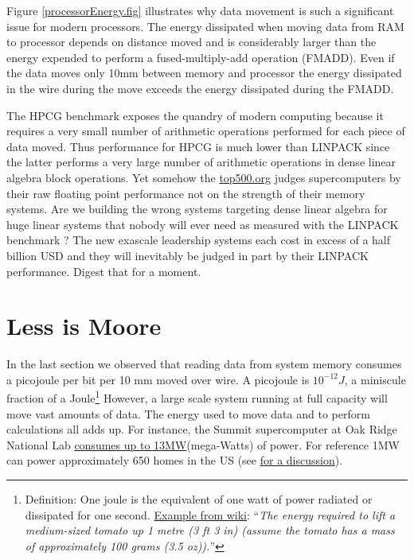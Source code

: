 Figure \ref{processorEnergy.fig} illustrates why data movement is such a significant issue for modern processors. The energy dissipated when moving data from RAM to processor depends on distance moved and is considerably larger than the energy expended to perform a fused-multiply-add operation (FMADD). Even if the data moves only 10mm between memory and processor the energy dissipated in the wire during the move exceeds the energy dissipated during the FMADD. 

The HPCG benchmark exposes the quandry of modern computing because it requires a very small number of arithmetic operations  performed for each piece of data moved. Thus performance for HPCG is much lower than LINPACK since the latter performs a very large number of arithmetic operations in dense linear algebra block operations.  Yet somehow the \href{http://top500.org}{top500.org} judges supercomputers by their raw floating point performance not on the strength of their memory systems. Are we building the wrong systems targeting dense linear algebra for huge linear systems that nobody will ever need as measured with the LINPACK benchmark ? The new exascale leadership systems each cost in excess of a half billion USD and they will  inevitably be  judged in part by their LINPACK performance. Digest that for a moment.


\section{Less is Moore}

In the last section we observed that reading data from system memory consumes a picojoule per bit per 10 mm moved over wire. A picojoule is $10^{-12}J$, a miniscule fraction of a Joule\footnote{Definition: One joule is the equivalent of one watt of power radiated or dissipated for one second. \href{https://en.wikipedia.org/wiki/Joule}{Example from wiki}: ``\emph{The energy required to lift a medium-sized tomato up 1 metre (3 ft 3 in) (assume the tomato has a mass of approximately 100 grams (3.5 oz)).}''}  However, a large scale system running at full capacity will move vast amounts of data. The energy used to move data and  to perform calculations all adds up. For instance, the Summit supercomputer at Oak Ridge National Lab \href{https://www.olcf.ornl.gov/summit/}{consumes up to 13MW}(mega-Watts) of power. For reference 1MW can power approximately 650 homes in the US (see \href{https://m.boiseweekly.com/boise/megawhat/Content?oid=3433953}{for a discussion}).
 
